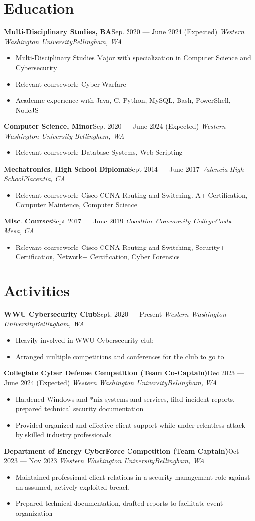 \documentclass{article}
\newcommand{\topLevelItem}[4]{
    \textbf{#1}\hfill #4\newline
    \emph{#2\hfill #3}\newline
    \vspace{-18pt}\begin{itemize}
}
\newcommand{\topLevelItemEnd}{\end{itemize}\vspace{5pt}}
\newcommand{\lowLevelItem}[1]{
    \item\small{#1}\vspace{-8pt}
}
\begin{document}
    \section*{Education}
        \topLevelItem{Multi-Disciplinary Studies, BA}{Western Washington University}{Bellingham, WA}{Sep. 2020 — June 2024 (Expected)}
            \lowLevelItem{Multi-Disciplinary Studies Major with specialization in Computer Science and Cybersecurity}
            \lowLevelItem{Relevant coursework: Cyber Warfare}
            \lowLevelItem{Academic experience with Java, C, Python, MySQL, Bash, PowerShell, NodeJS}
        \topLevelItemEnd
        \topLevelItem{Computer Science, Minor}{Western Washington University }{Bellingham, WA}{Sep. 2020 — June 2024 (Expected)}
            \lowLevelItem{Relevant coursework: Database Systems, Web Scripting}
        \topLevelItemEnd
        \topLevelItem{Mechatronics, High School Diploma}{Valencia High School}{Placentia, CA}{Sept 2014 — June 2017}
            \lowLevelItem{Relevant coursework: Cisco CCNA Routing and Switching, A+ Certification, Computer Maintence, Computer Science}
        \topLevelItemEnd
        \topLevelItem{Misc. Courses}{Coastline Community College}{Costa Mesa, CA}{Sept 2017 — June 2019}
            \lowLevelItem{Relevant coursework: Cisco CCNA Routing and Switching, Security+ Certification, Network+ Certification, Cyber Forensics}
        \topLevelItemEnd
        
    \section*{Activities}
        \topLevelItem{WWU Cybersecurity Club}{Western Washington University}{Bellingham, WA}{Sept. 2020 — Present}
            \lowLevelItem{Heavily involved in WWU Cybersecurity club}
            \lowLevelItem{Arranged multiple competitions and conferences for the club to go to}
        \topLevelItemEnd
        \topLevelItem{Collegiate Cyber Defense Competition (Team Co-Captain)}{Western Washington University}{Bellingham, WA}{Dec 2023 — June 2024 (Expected)}
            \lowLevelItem{Hardened Windows and *nix systems and services, filed incident reports, prepared technical security documentation}
            \lowLevelItem{Provided organized and effective client support while under relentless attack by skilled industry professionals}
        \topLevelItemEnd
        \topLevelItem{Department of Energy CyberForce Competition (Team Captain)}{Western Washington University}{Bellingham, WA}{Oct 2023 — Nov 2023}
            \lowLevelItem{Maintained professional client relations in a security management role against an assumed, actively exploited breach}
            \lowLevelItem{Prepared technical documentation, drafted reports to facilitate event organization}
        \topLevelItemEnd
        
\end{document}
